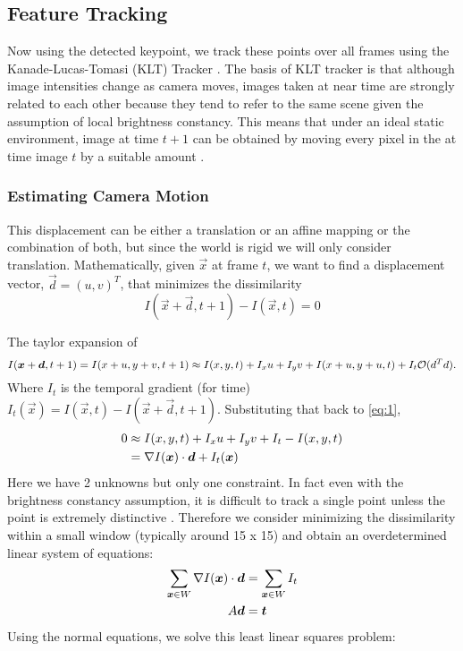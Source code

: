 \subsection{Feature Tracking}
\label{sec:feature-tracking}
Now using the detected keypoint, we track these points over all frames
using the Kanade-Lucas-Tomasi (KLT) Tracker \cite{KLT}.
The basis of KLT tracker is that although image intensities change as
camera moves, images taken at near time are strongly related to each
other because they tend to refer to the same scene given the
assumption of local brightness constancy. This means that under an ideal
static environment, image at time $t+1$ can be obtained by moving
every pixel in the at time image $t$ by a suitable amount \cite{shi}. 

\subsubsection{Estimating Camera Motion}
This displacement can be either a translation or an affine mapping or
the combination of both, but since the world is rigid we will only
consider translation. Mathematically, given $\vec x$ at frame $t$, we
want to find a displacement vector, $\vec d=(u,v)^T$, that minimizes
the dissimilarity
\begin{equation}
  \label{eq:1}
 I(\vec x + \vec d, t+1) - I(\vec x, t) = 0
\end{equation}

The taylor expansion of $$I(\boldsymbol{x}+\boldsymbol{d}, t+1) = I(x+u, y+v, t+1) \approx I(x,y,t) + I_xu +
I_yv + I(x+u, y+u, t) + I_t \mathcal{O}(d^Td).$$  Where $I_t$ is the temporal
gradient (for time) $I_t(\vec x) =I(\vec x, t) - I(\vec x+\vec d, t+1)$. Substituting that back to \eqref{eq:1},
\begin{align*}
0 &\approx I(x,y,t) + I_xu +I_yv  + I_t - I(x,y,t)\\
&= \nabla I(\boldsymbol{x})\cdot \boldsymbol{d} + I_t(\boldsymbol{x})
\end{align*}
 Here we have 2
unknowns but only one constraint. In fact even with the brightness
constancy assumption, it is difficult to track a single point unless
the point is extremely distinctive \cite{KLT}. Therefore we consider minimizing
the dissimilarity within a small window (typically around 15 x 15) and
obtain an overdetermined linear system of equations:
\begin{align*}
\sum_{\boldsymbol{x}\in W} \nabla I(\boldsymbol{x}) \cdot \boldsymbol{d} &= \sum_{\boldsymbol{x}\in W}
I_t \\
A\boldsymbol{d} &= \boldsymbol{t}
\end{align*}
Using the normal equations, we solve this least linear squares
problem:

